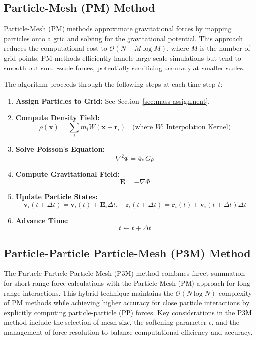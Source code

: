 \subsection{Particle-Mesh (PM) Method}
Particle-Mesh (PM) methods approximate gravitational forces by mapping particles onto a grid and solving for the gravitational potential. This approach reduces the computational cost to $\mathcal{O}(N + M \log M)$, where $M$ is the number of grid points. PM methods efficiently handle large-scale simulations but tend to smooth out small-scale forces, potentially sacrificing accuracy at smaller scales.

The algorithm proceeds through the following steps at each time step $t$:
\begin{enumerate}
    \item \textbf{Assign Particles to Grid:} See Section~\ref{sec:mass-assignment}.
    
    \item \textbf{Compute Density Field:}
    \[
    \rho(\mathbf{x}) = \sum_i m_i W(\mathbf{x} - \mathbf{r}_i) \quad \text{(where $W$: Interpolation Kernel)}
    \]
    
    \item \textbf{Solve Poisson's Equation:}
    \[
    \nabla^2 \Phi = 4\pi G \rho
    \]
    
    \item \textbf{Compute Gravitational Field:}
    \[
    \mathbf{E} = -\nabla \Phi
    \]
    
    \item \textbf{Update Particle States:}
    \[
    \mathbf{v}_i(t + \Delta t) = \mathbf{v}_i(t) + \mathbf{E}_i \Delta t, \quad \mathbf{r}_i(t + \Delta t) = \mathbf{r}_i(t) + \mathbf{v}_i(t + \Delta t) \Delta t
    \]
    
    \item \textbf{Advance Time:}
    \[
    t \leftarrow t + \Delta t
    \]
\end{enumerate}

\subsection{Particle-Particle Particle-Mesh (P3M) Method}
The Particle-Particle Particle-Mesh (P3M) method combines direct summation for short-range force calculations with the Particle-Mesh (PM) approach for long-range interactions. This hybrid technique maintains the $\mathcal{O}(N \log N)$ complexity of PM methods while achieving higher accuracy for close particle interactions by explicitly computing particle-particle (PP) forces. Key considerations in the P3M method include the selection of mesh size, the softening parameter $\epsilon$, and the management of force resolution to balance computational efficiency and accuracy.

